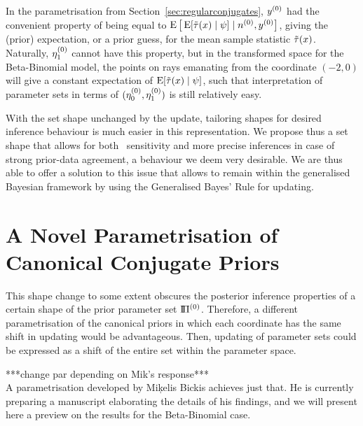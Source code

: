 In the parametrisation from Section~\ref{sec:regularconjugates},
$y^{(0)}$ had the convenient property of being equal to $\operatorname{E}\big[\operatorname{E}[\tilde{\tau}(x) \mid \psi] \mid n^{(0)}, y^{(0)}\big]$,
giving the (prior) expectation, or a prior guess, for the mean sample statistic $\tilde{\tau}(x)$.
Naturally, $\eta_1^{(0)}$ cannot have this property,
but in the transformed space for the Beta-Binomial model, the points on rays emanating from the coordinate $(-2,0)$
will give a constant expectation of $\operatorname{E}[\tilde{\tau}(x) \mid \psi]$,
such that interpretation of parameter sets in terms of $(\eta_0^{(0)},\eta_1^{(0)})$ is still relatively easy.

With the set shape unchanged by the update, 
tailoring shapes for desired inference behaviour is much easier in this representation.
We propose thus a set shape %
that allows for both \pdc\ sensitivity
and more precise inferences in case of strong prior-data agreement,
a behaviour we deem very desirable.
We are thus able to offer a solution to this issue that allows to remain within the generalised Bayesian framework
by using the Generalised Bayes' Rule for updating.


\section{A Novel Parametrisation of Canonical Conjugate Priors}
\label{sec:miksworld}

This shape change to some extent obscures the posterior inference properties
of a certain shape of the prior parameter set $\text{I}\!\Pi^{(0)}$.
Therefore, a different parametrisation of the canonical priors
in which each coordinate has the same shift in updating would be advantageous.
Then, updating of parameter sets
could be expressed as a shift of the entire set within the parameter space.

***change par depending on Mik's response***\\
A parametrisation developed by Mi\c{k}elis Bickis \cite[personal communication]{2011:bickis:geomip} achieves just that.
He is currently preparing a manuscript elaborating the details of his findings,
and we will present here a preview on the results for the Beta-Binomial case.

